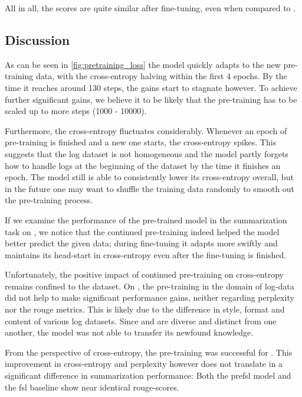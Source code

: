 All in all, the scores are quite similar after fine-tuning, even when compared to .

\subsection{Discussion}

As can be seen in \autoref{fig:pretraining_loss} the  model quickly adapts to the new pre-training data,
with the cross-entropy halving within the first 4 epochs.
By the time it reaches around 130 steps, the gains start to stagnate however.
To achieve further significant gains,
we believe it to be likely that the pre-training has to be scaled up to more steps (1000 - 10000).

Furthermore, the cross-entropy fluctuates considerably.
Whenever an epoch of pre-training is finished and a new one starts, the cross-entropy spikes.
This suggests that the log dataset is not homogeneous and the model partly forgets how to handle logs at the beginning of the dataset by the time it finishes an epoch.
The model still is able to consistently lower its cross-entropy overall,
but in the future one may want to shuffle the training data randomly to smooth out the pre-training process.

If we examine the performance of the pre-trained model in the summarization task on \telco{},
we notice that the continued pre-training indeed helped the model better predict the given data;
during fine-tuning it adapts more swiftly and maintains its head-start in cross-entropy even after the fine-tuning is finished.

Unfortunately, the positive impact of continued pre-training on cross-entropy remains confined to the \telco{} dataset.
On \logsummary{}, the pre-training in the domain of log-data did not help  to make significant performance gains,
neither regarding perplexity nor the \acs*{rouge} metrics.
This is likely due to the difference in style, format and content of various log datasets.
Since \logsummary{} and \telco{} are diverse and distinct from one another,
the model was not able to transfer its newfound knowledge.

From the perspective of cross-entropy, the pre-training was successful for \telco{}.
This improvement in cross-entropy and perplexity however does not translate in a significant difference in summarization performance:
Both the \ac{prefsl} model and the \ac{fsl} baseline show near identical \acs*{rouge}-scores.

